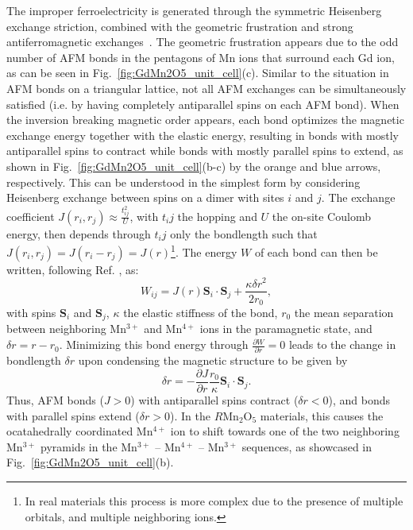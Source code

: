 The improper ferroelectricity is generated through the symmetric Heisenberg exchange striction, combined with the geometric frustration and strong antiferromagnetic exchanges~\cite{Choi2008}.
The geometric frustration appears due to the odd number of AFM bonds in the pentagons of Mn ions that surround each Gd ion, as can be seen in Fig.~\ref{fig:GdMn2O5_unit_cell}(c).
Similar to the situation in AFM bonds on a triangular lattice, not all AFM exchanges can be simultaneously satisfied (i.e. by having completely antiparallel spins on each AFM bond).
When the inversion breaking magnetic order appears, each bond optimizes the magnetic exchange energy together with the elastic energy, resulting in bonds with mostly antiparallel spins to contract while bonds with mostly parallel spins to extend, as shown in Fig.~\ref{fig:GdMn2O5_unit_cell}(b-c) by the orange and blue arrows, respectively.
This can be understood in the simplest form by considering Heisenberg exchange between spins on a dimer with sites $i$ and $j$.
The exchange coefficient $J(r_i, r_j)\approx \frac{t_{ij}^2}{U}$, with $t_ij$ the hopping and $U$ the on-site Coulomb energy, then depends through $t_ij$ only the bondlength such that $J(r_i, r_j) = J(r_i - r_j) = J(r)$\footnote{In real materials this process is more complex due to the presence of multiple orbitals, and multiple neighboring ions.}.
The energy $W$ of each bond can then be written, following Ref. \cite{Harris1972}, as:
\begin{equation}
	W_{ij} = J(r)\mathbf{S}_i \cdot \mathbf{S}_j + \frac{\kappa \delta r^2}{2r_0},
\end{equation}
with spins $\mathbf{S}_i$ and $\mathbf{S}_j$, $\kappa$ the elastic stiffness of the bond, $r_0$ the mean separation between neighboring Mn$^{3+}$ and Mn$^{4+}$ ions in the paramagnetic state, and $\delta r = r - r_0$.
Minimizing this bond energy through $\frac{\partial W}{\partial r} = 0$ leads to the change in bondlength $\delta r$ upon condensing the magnetic structure to be given by 
\begin{equation}
	\delta r = -\frac{\partial J}{\partial r}\frac{r_0}{\kappa}\mathbf{S}_i \cdot \mathbf{S}_j. 
\end{equation}
Thus, AFM bonds ($J > 0$) with antiparallel spins contract ($\delta r < 0$), and bonds with parallel spins extend ($\delta r > 0$).
In the $R$Mn$_2$O$_5$ materials, this causes the ocatahedrally coordinated Mn$^{4+}$ ion to shift towards one of the two neighboring Mn$^{3+}$ pyramids in the Mn$^{3+}$ -- Mn$^{4+}$ -- Mn$^{3+}$ sequences, as showcased in Fig.~\ref{fig:GdMn2O5_unit_cell}(b).
